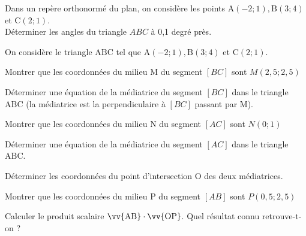 \documentclass[12pt,a4paper]{article}  %
\begin{document}









Dans un repère orthonormé du plan, on considère les points $\mathrm{A}(-2 ;1), \mathrm{B}(3 ; 4)$ et $\mathrm{C}(2 ; 1)$.\\
Déterminer les angles du triangle $A B C$ à 0,1 degré près.\\

\newpage

On considère le triangle $\mathrm{ABC}$ tel que $\mathrm{A}(-2 ;1), \mathrm{B}(3 ; 4)$ et $\mathrm{C}(2 ; 1)$.
\begin{enumMet}
    \item Montrer que les coordonnées du milieu M du segment $[BC]$ sont $M(2,5;2,5)$
    \item Déterminer une équation de la médiatrice  du segment $[BC]$ dans le triangle $\mathrm{ABC}$ (la médiatrice est la perpendiculaire à $[BC]$ passant par M).
    \item Montrer que les coordonnées du milieu N du segment $[AC]$ sont $N(0;1)$
    \item Déterminer une équation de la médiatrice  du segment $[AC]$ dans le triangle $\mathrm{ABC}$.
    \item Déterminer les coordonnées du point d'intersection $\mathrm{O}$ des deux médiatrices.
    \item Montrer que les coordonnées du milieu P du segment $[AB]$ sont $P(0,5;2,5)$
    \item Calculer le produit scalaire $\vv{\mathrm{AB}} \cdot \vv{\mathrm{OP}}$. Quel résultat connu retrouve-t-on ?
\end{enumMet}
\end{document}
